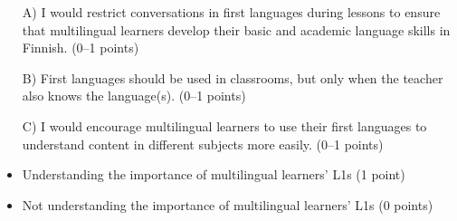 \documentclass[output=paper]{langscibook}
\begin{document}
		
\begin{itemize}
	\item[A)] I would restrict conversations in first languages during lessons to ensure that multilingual learners develop their basic and academic language skills in Finnish. (0–1 points)
	\item[B)] First languages should be used in classrooms, but only when the teacher also knows the language(s). (0–1 points)
	\item[C)] I would encourage multilingual learners to use their first languages to understand content in different subjects more easily. (0–1 points)
\end{itemize}

\begin{itemize}
\item Understanding the importance of multilingual learners’ L1s (1 point)
\item Not understanding the importance of multilingual learners’ L1s (0 points)
\end{itemize}
\printbibliography[heading=subbibliography,notkeyword=this]
\end{document}
